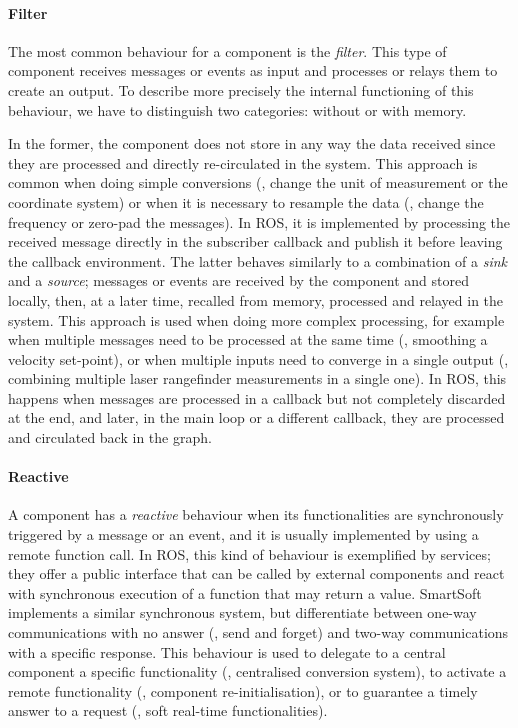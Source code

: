 \paragraph{Filter} The most common behaviour for a component is the \textit{filter}. This type of component receives messages or events as input and processes or relays them to create an output. To describe more precisely the internal functioning of this behaviour, we have to distinguish two categories: without or with memory. 

In the former, the component does not store in any way the data received since they are processed and directly re-circulated in the system. This approach is common when doing simple conversions (\eg, change the unit of measurement or the coordinate system) or when it is necessary to resample the data (\eg, change the frequency or zero-pad the messages). In ROS, it is implemented by processing the received message directly in the subscriber callback and publish it before leaving the callback environment. The latter behaves similarly to a combination of a \textit{sink} and a \textit{source}; messages or events are received by the component and stored locally, then, at a later time, recalled from memory, processed and relayed in the system. This approach is used when doing more complex processing, for example when multiple messages need to be processed at the same time (\eg, smoothing a velocity set-point), or when multiple inputs need to converge in a single output (\eg, combining multiple laser rangefinder measurements in a single one). In ROS, this happens when messages are processed in a callback but not completely discarded at the end, and later, in the main loop or a different callback, they are processed and circulated back in the graph.

\paragraph{Reactive} A component has a \textit{reactive} behaviour when its functionalities are synchronously triggered by a message or an event, and it is usually implemented by using a remote function call. In ROS, this kind of behaviour is exemplified by services; they offer a public interface that can be called by external components and react with synchronous execution of a function that may return a value.  SmartSoft implements a similar synchronous system, but differentiate between one-way communications with no answer (\ie, send and forget) and two-way communications with a specific response. This behaviour is used to delegate to a central component a specific functionality (\eg, centralised conversion system), to activate a remote functionality (\eg, component \mbox{re-initialisation}), or to guarantee a timely answer to a request (\eg, soft real-time functionalities).

